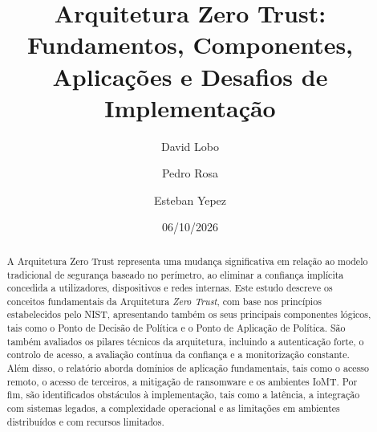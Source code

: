 \documentclass{llncs}
\begin{document}
\title{Arquitetura Zero Trust: Fundamentos, Componentes, Aplicações e Desafios de Implementação}

\author{David Lobo \and Pedro Rosa \and Esteban Yepez}



\date{06/10/2026}



\maketitle

\begin{abstract}
A Arquitetura Zero Trust representa uma mudança significativa em relação ao modelo tradicional de segurança baseado no perímetro, ao eliminar a confiança implícita concedida a utilizadores, dispositivos e redes internas. Este estudo descreve os conceitos fundamentais da Arquitetura \textit{Zero Trust}, com base nos princípios estabelecidos pelo NIST, apresentando também os seus principais componentes lógicos, tais como o Ponto de Decisão de Política e o Ponto de Aplicação de Política. São também avaliados os pilares técnicos da arquitetura, incluindo a autenticação forte, o controlo de acesso, a avaliação contínua da confiança e a monitorização constante. Além disso, o relatório aborda domínios de aplicação fundamentais, tais como o acesso remoto, o acesso de terceiros, a mitigação de ransomware e os ambientes IoMT. Por fim, são identificados obstáculos à implementação, tais como a latência, a integração com sistemas legados, a complexidade operacional e as limitações em ambientes distribuídos e com recursos limitados.
\end{abstract}
\end{document}
